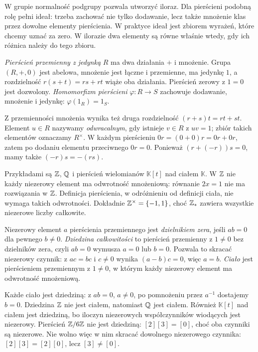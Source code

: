 W grupie normalność podgrupy pozwala utworzyć
iloraz. Dla pierścieni podobną rolę pełni ideał:
trzeba zachować nie tylko dodawanie, lecz także
mnożenie klas przez dowolne elementy pierścienia.
W praktyce ideał jest zbiorem wyrażeń, które chcemy
uznać za zero. W ilorazie dwa elementy są równe
właśnie wtedy, gdy ich różnica należy do tego zbioru.

\begin{definicja}
\label{def:pierscien-przemienny}
\emph{Pierścień przemienny z jedynką} $R$ ma
dwa działania $+$ i mnożenie. Grupa $(R,+,0)$
jest abelowa, mnożenie jest łączne i przemienne,
ma jedynkę $1$, a rozdzielność
$r(s+t)=rs+rt$ wiąże oba działania.
Pierścień zerowy z $1=0$ jest dozwolony.
\emph{Homomorfizm pierścieni}
$\varphi:R\to S$ zachowuje dodawanie, mnożenie
i jedynkę: $\varphi(1_R)=1_S$.
\end{definicja}

Z przemienności mnożenia wynika też druga rozdzielność
$(r+s)t=rt+st$. Element $u\in R$ nazywamy
\emph{odwracalnym}, gdy istnieje $v\in R$ z $uv=1$;
zbiór takich elementów oznaczamy $R^\times$.
W każdym pierścieniu $0r=(0+0)r=0r+0r$,
zatem po dodaniu elementu przeciwnego $0r=0$.
Ponieważ $(r+(-r))s=0$, mamy także $(-r)s=-(rs)$.

Przykładami są $\mathbb{Z}$, $\mathbb{Q}$ i pierścień
wielomianów $\mathbb K[t]$ nad ciałem $\mathbb K$.
W $\mathbb{Z}$ nie każdy niezerowy element ma odwrotność
mnożeniową: równanie $2x=1$ nie ma rozwiązania
w $\mathbb{Z}$. Definicja pierścienia, w odróżnieniu od definicji
ciała, nie wymaga takich odwrotności. Dokładnie
$\mathbb{Z}^\times=\{-1,1\}$, choć $\mathbb{Z}_*$ zawiera wszystkie
niezerowe liczby całkowite.

\begin{definicja}
\label{def:dziedzina-cialo-5}
Niezerowy element $a$ pierścienia przemiennego jest \emph{dzielnikiem
zera}, jeśli $ab=0$ dla pewnego $b\ne0$. \emph{Dziedzina całkowitości}
to pierścień przemienny z $1\ne0$ bez dzielników zera, czyli
$ab=0$ wymusza $a=0$ lub $b=0$. Pozwala to skracać niezerowy czynnik:
z $ac=bc$ i $c\ne0$ wynika $(a-b)c=0$, więc $a=b$.
\emph{Ciało} jest pierścieniem przemiennym z $1\ne0$, w którym
każdy niezerowy element ma odwrotność mnożeniową.
\end{definicja}

Każde ciało jest dziedziną: z $ab=0$, $a\ne0$, po pomnożeniu
przez $a^{-1}$ dostajemy $b=0$. Dziedzina $\mathbb{Z}$ nie jest ciałem,
natomiast $\mathbb{Q}$ jest ciałem. Również $\mathbb K[t]$ nad ciałem
jest dziedziną, bo iloczyn niezerowych współczynników wiodących
jest niezerowy. Pierścień $\mathbb{Z}/6\mathbb{Z}$ nie jest dziedziną:
$[2][3]=[0]$, choć oba czynniki są niezerowe.
Nie wolno więc w nim skracać dowolnego niezerowego czynnika:
$[2][3]=[2][0]$, lecz $[3]\ne[0]$.

